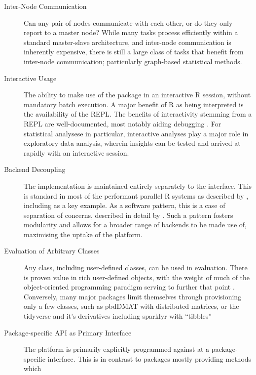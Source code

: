 \documentclass[a4paper,10pt]{article}
\begin{document}
\begin{description}
	\item[Inter-Node Communication]
	      Can any pair of nodes communicate with each other, or do they
	      only report to a master node?
	      While many tasks process efficiently within a standard
	      master-slave architecture, and inter-node communication is
	      inherently expensive, there is still a large class of tasks
	      that benefit from inter-node communication\cite{walker1996mpi};
	      particularly graph-based statistical methods.
	\item[Interactive Usage]
	      The ability to make use of the package in an interactive R
	      session, without mandatory batch execution.
	      A major benefit of R as being interpreted is the availability
	      of the REPL. The benefits of interactivity stemming from a REPL
	      are well-documented, most notably aiding debugging
	      \cite{mccarthy1978history}. For statistical analysese in 
	      particular, interactive analyses play a major role in 
	      exploratory data analysis, wherein insights can be tested
	      and arrived at rapidly with an interactive session.
	\item[Backend Decoupling]
	      The implementation is maintained entirely separately to the
	      interface.
	      This is standard in most of the performant parallel R systems
	      as described by \cite{eddelbuettel2019parallel}, including
	      \cite{microsoft20} as a key example.
	      As a software pattern, this is a case of separation of
	      concerns, described in detail by \cite{dijkstra1982role}.
	      Such a pattern fosters modularity and allows for a broader
	      range of backends to be made use of, maximising the uptake of
	      the platform.
	\item[Evaluation of Arbitrary Classes]
	      Any class, including user-defined classes, can be used in
	      evaluation.
	      There is proven value in rich user-defined objects, with the
	      weight of much of the object-oriented programming paradigm
	      serving to further that point \cite{dahl2004simula}.
	      Conversely, many major packages limit themselves through
	      provisioning only a few classes, such as pbdDMAT with
	      distributed matrices, or the tidyverse and it's derivatives
	      including sparklyr with ``tibbles'' \cite{pbdDMATpackage}
	      \cite{wickham2019welcome}
	\item[Package-specific API as Primary Interface]
	      The platform is primarily explicitly programmed against at a
	      package-specific interface. 
	      This is in contrast to packages mostly providing methods which

\end{description}
\end{document}
